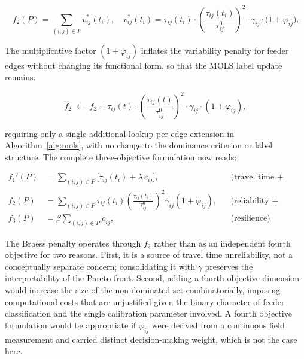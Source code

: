 \begin{equation}
  \boxed{
  f_2(P) = \sum_{(i,j)\in P} v_{ij}^{*}(t_i),
  \quad
  v_{ij}^{*}(t_i)
    = \tau_{ij}(t_i)
      \cdot\!\left(\frac{\tau_{ij}(t_i)}{\tau_{ij}^{0}}\right)^{\!2}
      \cdot \gamma_{ij}
      \cdot \bigl(1 + \varphi_{ij}\bigr).
  }
  \label{eq:f2_modified}
\end{equation}

The multiplicative factor $(1+\varphi_{ij})$ inflates the variability
penalty for feeder edges without changing its functional form, so that
the MOLS label update remains:

\begin{equation}
  \hat{f}_2 \;\leftarrow\; f_2
    + \tau_{ij}(t)\cdot\!\left(\frac{\tau_{ij}(t)}{\tau_{ij}^{0}}
      \right)^{\!2}\!\cdot\gamma_{ij}\cdot(1+\varphi_{ij}),
  \label{eq:mols_f2_update}
\end{equation}

requiring only a single additional lookup per edge extension in
Algorithm~\ref{alg:mols}, with no change to the dominance criterion or
label structure. The complete three-objective formulation now reads:

\begin{equation}
  \begin{aligned}
    f_1'(P) &= \sum_{(i,j)\in P} \bigl[\tau_{ij}(t_i) + \lambda\,
               c_{ij}\bigr],
               && \text{(travel time + cost)} \\[4pt]
    f_2(P)  &= \sum_{(i,j)\in P}
               \tau_{ij}(t_i)
               \!\left(\frac{\tau_{ij}(t_i)}{\tau_{ij}^{0}}\right)^{\!2}
               \!\gamma_{ij}(1+\varphi_{ij}),
               && \text{(reliability + Braess penalty)} \\[4pt]
    f_3(P)  &= \beta \sum_{(i,j)\in P} \rho_{ij},
               && \text{(resilience)}
  \end{aligned}
  \label{eq:mop_revised}
\end{equation}

\begin{remark}
The Braess penalty operates through $f_2$ rather than as an independent
fourth objective for two reasons. First, it is a source of travel time
unreliability, not a conceptually separate concern; consolidating it with
$\gamma$ preserves the interpretability of the Pareto front. Second,
adding a fourth objective dimension would increase the size of the
non-dominated set combinatorially, imposing computational costs that are
unjustified given the binary character of feeder classification and the
single calibration parameter involved. A fourth objective formulation
would be appropriate if $\varphi_{ij}$ were derived from a continuous
field measurement and carried distinct decision-making weight, which is
not the case here.
\end{remark}

